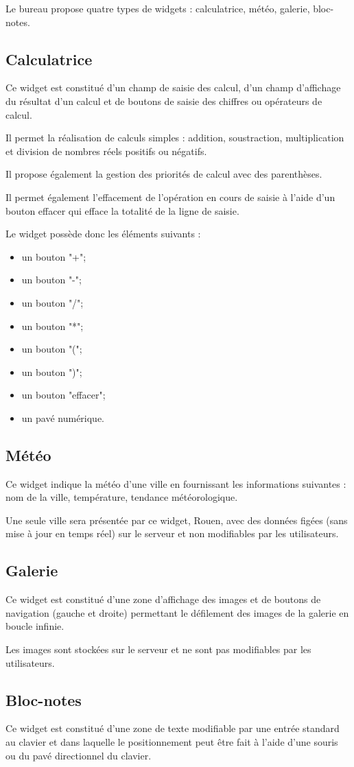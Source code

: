 Le bureau propose quatre types de widgets : calculatrice, météo, galerie, bloc-notes.

\subsection*{Calculatrice}
Ce widget est constitué d'un champ de saisie des calcul, d'un champ d'affichage du résultat d'un calcul et de boutons de saisie des chiffres ou opérateurs de calcul.

Il permet la réalisation de calculs simples : addition, soustraction, multiplication et division de nombres réels positifs ou négatifs.

Il propose également la gestion des priorités de calcul avec des parenthèses.

Il permet également l'effacement de l'opération en cours de saisie à l'aide d'un bouton effacer qui efface la totalité de la ligne de saisie.

Le widget possède donc les éléments suivants :
\begin{itemize}
\item un bouton "+";
\item un bouton "-";
\item un bouton "/";
\item un bouton "*";
\item un bouton "(";
\item un bouton ")";
\item un bouton "effacer";
\item un pavé numérique.
\end{itemize}

\subsection*{Météo}
Ce widget indique la météo d'une ville en fournissant les informations suivantes : nom de la ville, température, tendance météorologique.

Une seule ville sera présentée par ce widget, Rouen, avec des données figées (sans mise à jour en temps réel) sur le serveur et non modifiables par les utilisateurs.

\subsection*{Galerie}
Ce widget est constitué d'une zone d'affichage des images et de boutons de navigation (gauche et droite) permettant le défilement des images de la galerie en boucle infinie.

Les images sont stockées sur le serveur et ne sont pas modifiables par les utilisateurs.

\subsection*{Bloc-notes}
Ce widget est constitué d'une zone de texte modifiable par une entrée standard au clavier et dans laquelle le positionnement peut être fait à l'aide d'une souris ou du pavé directionnel du clavier.